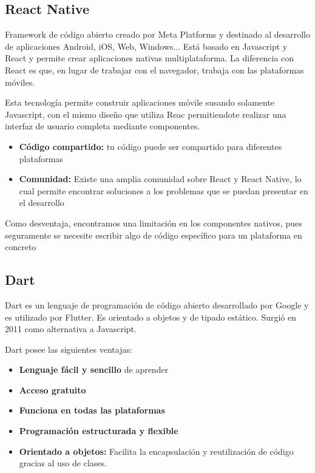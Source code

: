 \subsection{React Native}
Framework de código abierto creado por Meta Platforms y destinado al desarrollo de aplicaciones Android, iOS, Web, Windows...
Está basado en Javascript y React y permite crear aplicaciones nativas multiplataforma. La diferencia con React es que, en lugar de 
trabajar con el navegador, trabaja con las plataformas móviles. 

Esta tecnología permite construir aplicaciones móvile susando solamente Javascript, con el mismo diseño que utiliza
Reac permitiendote realizar una interfaz de usuario completa mediante componentes. 

\begin{itemize}
    \item \textbf{Código compartido:} tu código puede ser compartido para diferentes plataformas
    \item \textbf{Comunidad:} Existe una amplia comunidad sobre React y React Native, lo cual permite encontrar soluciones a los problemas que se puedan presentar en el desarrollo
\end {itemize}

Como desventaja, encontramos una limitación en los componentes nativos, pues seguramente se necesite escribir algo de código
específico para un plataforma en concreto
\subsection{Dart}
Dart es un lenguaje de programación de código abierto desarrollado por Google y es utilizado por Flutter.
Es  orientado a objetos y de tipado estático. Surgió en 2011 como alternativa a Javascript.

Dart posee las siguientes ventajas:

\begin{itemize}
    \item \textbf{Lenguaje fácil y sencillo} de aprender
    \item \textbf{Acceso gratuito}
    \item \textbf{Funciona en todas las plataformas}
    \item \textbf{Programación estructurada y flexible}
    \item \textbf{Orientado a objetos:} Facilita la encapsulación y reutilización de código gracias al uso de clases.
     
\end{itemize}

